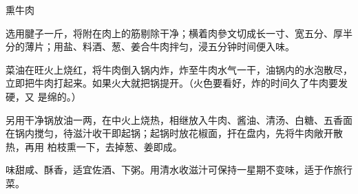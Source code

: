 \begin{recipe}{熏牛肉}

\ingredients


\preparation

\step 选用腱子一斤，将附在肉上的筋剔除干净；横着肉參文切成长一寸、宽五分、厚半
分的薄片；用盐、料酒、葱、姜合牛肉拌匀，浸五分钟时间便入味。

\step 菜油在旺火上烧红，将牛肉倒入锅内炸，炸至牛肉水气一干，油锅内的水泡散尽，
立即把牛肉打起来。如果火大就把锅提开。（火色要看好，炸的时间久了牛肉要发硬，又
是绵的。）

\step 另用干净锅放油一两，在中火上烧热，相继放入牛肉、酱油、清汤、白糖、五香面
在锅内搅匀，待滋汁收干即起锅；起锅时放花椒面，扞在盘内，先将牛肉敞开散热，再用
柏枝熏一下，去掉葱、姜即成。

\features

味甜咸、酥香，适宜佐酒、下粥。用清水收滋汁可保持一星期不变味，适于作旅行菜。

\end{recipe}

